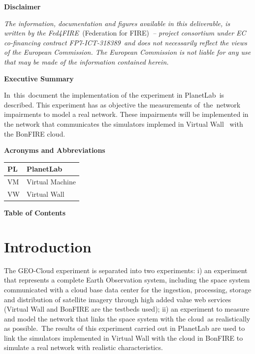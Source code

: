 \documentclass[a4paper]{article}
\begin{document}
\bigskip

\clearpage
\textrm{\textbf{Disclaimer}}


\bigskip

\textit{The information, documentation and figures available in this
deliverable, is written by the Fed4FIRE\ }(Federation for
FIRE)\ \textit{{}-- project consortium under EC co-financing contract
FP7-ICT-}\textit{318389}\textit{\ and does not necessarily reflect the
views of the European Commission}\textit{. The European
C}\textit{ommission is not liable for any use that may be made of the
information contained herein.}

\clearpage
\textrm{\textbf{Executive S}}\textrm{\textbf{ummary}}

In\ this\ document the implementation of the experiment in PlanetLab\ is
described. This experiment has as objective the measurements
of\ the\ network impairments to model a real network. These impairments
will be implemented in the network that communicates the simulators
implemed in Virtual Wall \ with the BonFIRE cloud.\ 

\clearpage
\textrm{\textbf{A}}\textrm{\textbf{cronyms and
A}}\textrm{\textbf{bbreviations}}


\bigskip

\begin{flushleft}
\tablehead{}
\begin{supertabular}{|m{0.8823598in}|m{5.35596in}|}
\hline
PL &
PlanetLab\\\hline
VM &
Virtual Machine\\\hline
VW &
Virtual Wall\\\hline
\end{supertabular}
\end{flushleft}
\clearpage
\textrm{\textbf{Table of C}}\textrm{\textbf{ontents}}


\bigskip

\setcounter{tocdepth}{3}
\tableofcontents

\bigskip

\section[Introduction]{Introduction}
\hypertarget{Toc387315382}{}The GEO-Cloud experiment is separated into
two experiments: i) an experiment that represents a complete Earth
Observation system, including the space system communicated with a
cloud base data center for the ingestion, processing, storage and
distribution of satellite imagery through high added value web services
(Virtual Wall and BonFIRE are the testbeds used); ii) an experiment to
measure and model the network that links the space system with the
cloud\ as realistically as possible.\ The results of this experiment
carried out in PlanetLab are used to link the simulators implemented in
Virtual Wall with the cloud in BonFIRE to simulate a real network with
realistic characteristics.
\end{document}
